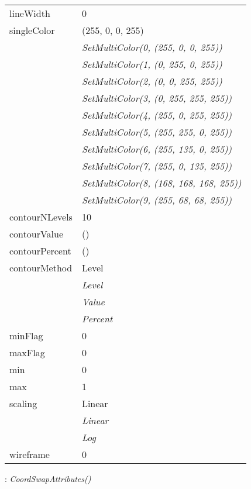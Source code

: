 \documentclass[10pt,a4paper]{report}
\begin{document}
\begin{longtable}{lp{7.5cm}}
lineWidth  &  0 \\
singleColor  &  (255, 0, 0, 255) \\
 & {\it  SetMultiColor(0, (255, 0, 0, 255))} \\
 & {\it  SetMultiColor(1, (0, 255, 0, 255))} \\
 & {\it  SetMultiColor(2, (0, 0, 255, 255))} \\
 & {\it  SetMultiColor(3, (0, 255, 255, 255))} \\
 & {\it  SetMultiColor(4, (255, 0, 255, 255))} \\
 & {\it  SetMultiColor(5, (255, 255, 0, 255))} \\
 & {\it  SetMultiColor(6, (255, 135, 0, 255))} \\
 & {\it  SetMultiColor(7, (255, 0, 135, 255))} \\
 & {\it  SetMultiColor(8, (168, 168, 168, 255))} \\
 & {\it  SetMultiColor(9, (255, 68, 68, 255))} \\
contourNLevels  &  10 \\
contourValue  &  () \\
contourPercent  &  () \\
contourMethod  &  Level   \\
 & {\it  Level} \\
 & {\it  Value} \\
 & {\it  Percent} \\
minFlag  &  0 \\
maxFlag  &  0 \\
min  &  0 \\
max  &  1 \\
scaling  &  Linear   \\
 & {\it  Linear} \\
 & {\it  Log} \\
wireframe  &  0 \\
\end{longtable}

\newpage

{}
: {\it CoordSwapAttributes() }\\[-3mm]
\end{document}
